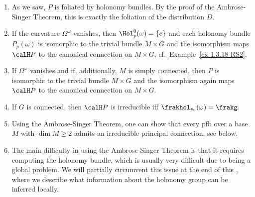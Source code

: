 \begin{rem}
    \begin{enumerate}
        \item As we saw, $P$ is foliated by holonomy bundles. By the proof of the Ambrose-Singer Theorem, this is exactly the foliation of the distribution $D$.

        \item If the curvature $\Omega^\omega$ vanishes, then $\Hol_p^0(\omega)=\{e\}$ and each holonomy bundle $P_p(\omega)$ is isomorphic to the trivial bundle $M\times G$ and the isomorphism maps $\calH P$ to the canonical connection on $M\times G$, cf.\ Example~\ref{ex 1.3.18 RS2}.

        \item If $\Omega^\omega$ vanishes and if, additionally, $M$ is simply connected, then $P$ is isomorphic to the trivial bundle $M\times G$ and the isomorphism again maps $\calH P$ to the canonical connection on $M\times G$.
        
        \item If $G$ is connected, then $\calH P$ is irreducible iff $\frakhol_{p_0}(\omega)=\frakg$.

        \item Using the Ambrose-Singer Theorem, one can show that every \gls{pfb} over a base $M$ with $\dim M\geq 2$ admits an irreducible principal connection, see below.
    
        \item The main difficulty in using the Ambrose-Singer Theorem is that it requires computing the holonomy bundle, which is usually very difficult due to being a global problem. We will partially circumvent this issue at the end of this \sect, where we describe what information about the holonomy group can be inferred locally.
    \end{enumerate}
\end{rem}



